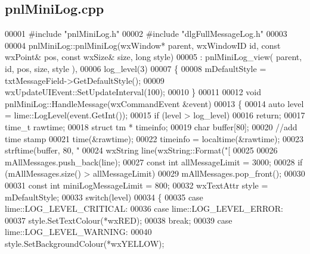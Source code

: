 \subsection{pnl\+Mini\+Log.\+cpp}
\label{pnlMiniLog_8cpp_source}

\begin{DoxyCode}
00001 \textcolor{preprocessor}{#include "pnlMiniLog.h"}
00002 \textcolor{preprocessor}{#include "dlgFullMessageLog.h"}
00003 
00004 pnlMiniLog::pnlMiniLog(wxWindow* parent, wxWindowID \textcolor{keywordtype}{id}, \textcolor{keyword}{const} wxPoint& pos, \textcolor{keyword}{const} wxSize& 
      size, \textcolor{keywordtype}{long} style)
00005     : pnlMiniLog_view( parent, id, pos, size, style ),
00006         log_level(3)
00007 \{
00008     mDefaultStyle = txtMessageField->GetDefaultStyle();
00009     wxUpdateUIEvent::SetUpdateInterval(100);
00010 \}
00011 
00012 \textcolor{keywordtype}{void} pnlMiniLog::HandleMessage(wxCommandEvent &event)
00013 \{
00014     \textcolor{keyword}{auto} level = lime::LogLevel(event.GetInt());
00015     \textcolor{keywordflow}{if} (level > log_level)
00016         \textcolor{keywordflow}{return};
00017     time\_t rawtime;
00018     \textcolor{keyword}{struct }tm * timeinfo;
00019     \textcolor{keywordtype}{char} buffer[80];
00020     \textcolor{comment}{//add time stamp}
00021     time(&rawtime);
00022     timeinfo = localtime(&rawtime);
00023     strftime(buffer, 80, \textcolor{stringliteral}{"%
00024     wxString line(wxString::Format(\textcolor{stringliteral}{"[%
00025 
00026     mAllMessages.push\_back(line);
00027     \textcolor{keyword}{const} \textcolor{keywordtype}{int} allMessageLimit = 3000;
00028     \textcolor{keywordflow}{if} (mAllMessages.size() > allMessageLimit)
00029         mAllMessages.pop\_front();
00030 
00031     \textcolor{keyword}{const} \textcolor{keywordtype}{int} miniLogMessageLimit = 800;
00032     wxTextAttr style = mDefaultStyle;
00033     \textcolor{keywordflow}{switch}(level)
00034     \{
00035         \textcolor{keywordflow}{case} lime::LOG_LEVEL_CRITICAL:
00036         \textcolor{keywordflow}{case} lime::LOG_LEVEL_ERROR:
00037                 style.SetTextColour(*wxRED);
00038                 \textcolor{keywordflow}{break};
00039         \textcolor{keywordflow}{case} lime::LOG_LEVEL_WARNING:
00040                 style.SetBackgroundColour(*wxYELLOW);
}}
\end{DoxyCode}
